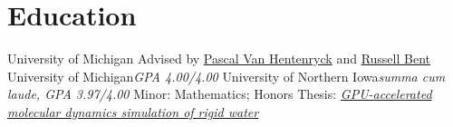\section{Education}
		{University of Michigan}{}{}
		{Advised by \href{http://pascalvanhentenryck.engin.umich.edu/}{Pascal Van Hentenryck} and \href{http://public.lanl.gov/rbent/}{Russell Bent}}
		{University of Michigan}{}{\textit{GPA 4.00/4.00}}
		{}
		{University of Northern Iowa}{}{\textit{summa cum laude, GPA 3.97/4.00}}
		{Minor: Mathematics; Honors Thesis: \href{http://byron.tasseff.com/documents/reports/2012-gpu_accelerated_molecular_dynamics_simulation_of_rigid_water.pdf}{\textit{GPU-accelerated molecular dynamics simulation of rigid water}}}
